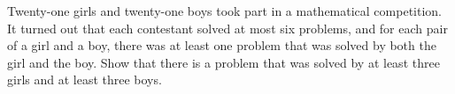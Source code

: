 Twenty-one girls and twenty-one boys took part in a mathematical competition.
It turned out that each contestant solved at most six problems,
and for each pair of a girl and a boy,
there was at least one problem that was solved by both the girl and the boy.
Show that there is a problem that was solved by at least three girls and at least three boys.